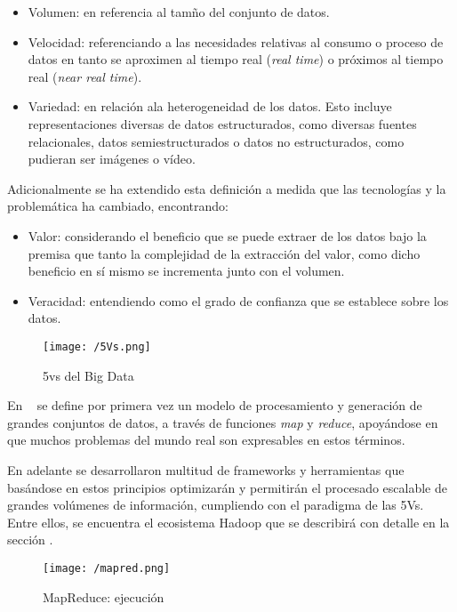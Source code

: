 \begin{itemize}
\item Volumen: en referencia al tamño del conjunto de datos. 
\item Velocidad: referenciando a las necesidades relativas al consumo o proceso
  de datos en tanto se aproximen al tiempo real (\textit{real time}) o próximos
  al tiempo real (\textit{near real time}).
\item Variedad: en relación ala heterogeneidad de los datos. Esto incluye
  representaciones diversas de datos estructurados, como diversas fuentes
  relacionales, datos semiestructurados o datos no estructurados, como pudieran
  ser imágenes o vídeo. 
\end{itemize}

Adicionalmente se ha extendido esta definición a medida que las tecnologías y la
problemática ha cambiado, encontrando:

\begin{itemize}
\item Valor: considerando el beneficio que se puede extraer de los datos bajo la
  premisa que tanto la complejidad de la extracción del valor, como dicho
  beneficio en sí mismo se incrementa junto con el volumen.
  
\item Veracidad: entendiendo como el grado de confianza que se establece sobre
  los datos. 
\end{itemize}


\begin{figure}[!h]
  \begin{center}
    \texttt{[image: /5Vs.png]} 
    \caption{5vs del Big Data}
    \label{fig:5Vs}
  \end{center}
\end{figure}

En ~\cite{map_reduce} se define por primera vez un modelo de procesamiento y
generación de grandes conjuntos de datos, a través de funciones \textit{map} y
\textit{reduce}, apoyándose en que muchos problemas del mundo real son
expresables en estos términos.

En adelante se desarrollaron multitud de frameworks y herramientas que basándose
en estos principios optimizarán y permitirán el procesado escalable de grandes
volúmenes de información, cumpliendo con el paradigma de las 5Vs. Entre ellos,
se encuentra el ecosistema Hadoop que se describirá con detalle en la sección
.

\begin{figure}[!h]
  \begin{center}
    \texttt{[image: /mapred.png]} 
    \caption{MapReduce: ejecución ~\cite{map_reduce}}
    \label{fig:mapred}
  \end{center}
\end{figure}


